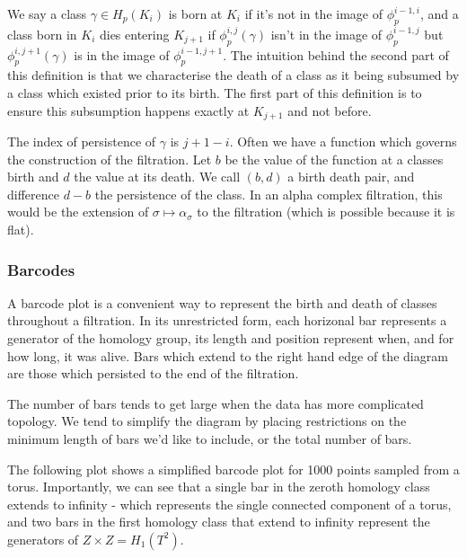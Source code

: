 We say a class $\gamma \in H_p(K_i)$ is born at $K_i$ if it's not in the image of $\phi_p^{i-1, i}$, and a class born in $K_i$ dies entering $K_{j+1}$ if $\phi_p^{i, j}(\gamma)$ isn't in the image of $\phi_p^{i-1, j}$ but $\phi_p^{i, j+1}(\gamma)$ is in the image of $\phi_p^{i-1, j+1}$. The intuition behind the second part of this definition is that we characterise the death of a class as it being subsumed by a class which existed prior to its birth. The first part of this definition is to ensure this subsumption happens exactly at $K_{j+1}$ and not before.

The index of persistence of $\gamma$ is $j + 1 - i$. Often we have a function which governs the construction of the filtration. Let $b$ be the value of the function at a classes birth and $d$ the value at its death. We call $(b, d)$ a birth death pair, and difference $d - b$ the persistence of the class. In an alpha complex filtration, this would be the extension of $\sigma \mapsto \alpha_{\sigma}$ to the filtration (which is possible because it is flat).


\subsubsection{Barcodes}

A barcode plot is a convenient way to represent the birth and death of classes throughout a filtration. In its unrestricted form, each horizonal bar represents a generator of the homology group, its length and position represent when, and for how long, it was alive. Bars which extend to the right hand edge of the diagram are those which persisted to the end of the filtration. 

The number of bars tends to get large when the data has more complicated topology. We tend to simplify the diagram by placing restrictions on the minimum length of bars we'd like to include, or the total number of bars.

The following plot shows a simplified barcode plot for 1000 points sampled from a torus. Importantly, we can see that a single bar in the zeroth homology class extends to infinity - which represents the single connected component of a torus, and two bars in the first homology class that extend to infinity represent the generators of $Z \times Z = H_1(T^2)$.

